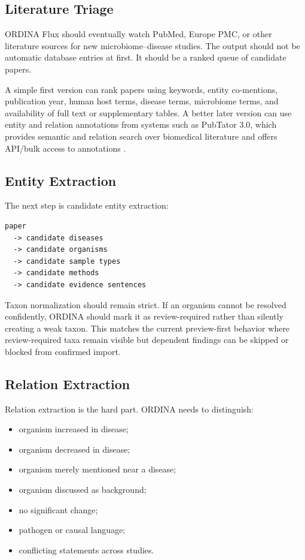 \documentclass[11pt,a4paper]{article}
\begin{document}
\subsection{Literature Triage}

ORDINA Flux should eventually watch PubMed, Europe PMC, or other literature sources for new microbiome--disease studies. The output should not be automatic database entries at first. It should be a ranked queue of candidate papers.

A simple first version can rank papers using keywords, entity co-mentions, publication year, human host terms, disease terms, microbiome terms, and availability of full text or supplementary tables. A better later version can use entity and relation annotations from systems such as PubTator 3.0, which provides semantic and relation search over biomedical literature and offers API/bulk access to annotations \cite{pubtator3}.

\subsection{Entity Extraction}

The next step is candidate entity extraction:

\begin{verbatim}
paper
  -> candidate diseases
  -> candidate organisms
  -> candidate sample types
  -> candidate methods
  -> candidate evidence sentences
\end{verbatim}

Taxon normalization should remain strict. If an organism cannot be resolved confidently, ORDINA should mark it as review-required rather than silently creating a weak taxon. This matches the current preview-first behavior where review-required taxa remain visible but dependent findings can be skipped or blocked from confirmed import.

\subsection{Relation Extraction}

Relation extraction is the hard part. ORDINA needs to distinguish:

\begin{itemize}[noitemsep]
    \item organism increased in disease;
    \item organism decreased in disease;
    \item organism merely mentioned near a disease;
    \item organism discussed as background;
    \item no significant change;
    \item pathogen or causal language;
    \item conflicting statements across studies.
\end{itemize}
\end{document}

